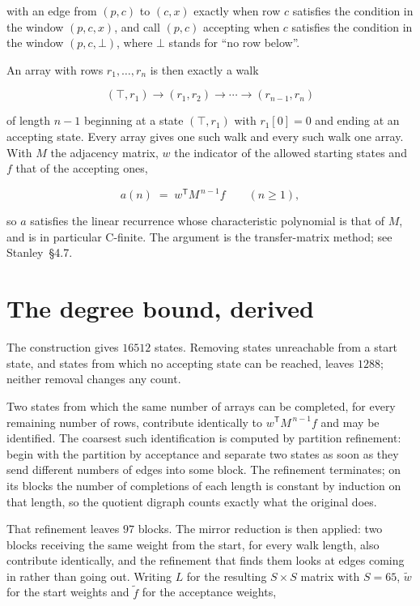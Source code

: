 \documentclass[11pt]{article}
\theoremstyle{definition}
\begin{document}
with an edge from $(p,c)$ to $(c,x)$ exactly when row $c$ satisfies the condition in the window $(p,c,x)$, and call $(p,c)$ accepting when $c$ satisfies the condition in the window $(p,c,\bot)$, where $\bot$ stands for ``no row below''.

An array with rows $r_1,\dots,r_n$ is then exactly a walk

\[(\top,r_1) \to (r_1,r_2) \to \cdots \to (r_{n-1},r_n)\]

of length $n-1$ beginning at a state $(\top,r_1)$ with $r_1[0]=0$ and ending at an accepting state. Every array gives one such walk and every such walk one array. With $M$ the adjacency matrix, $w$ the indicator of the allowed starting states and $f$ that of the accepting ones,

\[a(n) \;=\; w^{\mathsf T} M^{\,n-1} f \qquad (n \ge 1),\]

so $a$ satisfies the linear recurrence whose characteristic polynomial is that of $M$, and is in particular C-finite. The argument is the transfer-matrix method; see Stanley~\S4.7.

\section{The degree bound, derived}

The construction gives $16512$ states. Removing states unreachable from a start state, and states from which no accepting state can be reached, leaves $1288$; neither removal changes any count.

Two states from which the same number of arrays can be completed, for every remaining number of rows, contribute identically to $w^{\mathsf T}M^{\,n-1}f$ and may be identified. The coarsest such identification is computed by partition refinement: begin with the partition by acceptance and separate two states as soon as they send different numbers of edges into some block. The refinement terminates; on its blocks the number of completions of each length is constant by induction on that length, so the quotient digraph counts exactly what the original does.

That refinement leaves $97$ blocks. The mirror reduction is then applied: two blocks receiving the same weight from the start, for every walk length, also contribute identically, and the refinement that finds them looks at edges coming in rather than going out. Writing $L$ for the resulting $S \times S$ matrix with $S = 65$, $\tilde w$ for the start weights and $\tilde f$ for the acceptance weights,
\end{document}
